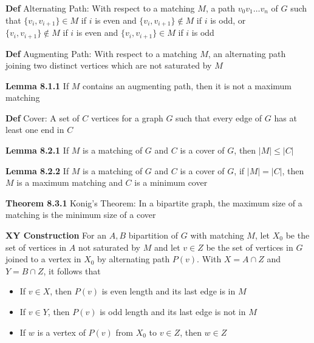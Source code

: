 \documentclass[11pt,notitlepage]{report}
\newcommand{\tbf}[1]{\textbf{#1}}
\begin{document}
\tbf{Def} Alternating Path: With respect to a matching $M$, a path $v_0v_1\dots v_n$ of $G$ such that $\{v_i,v_{i+1}\} \in M$ if $i$ is even and $\{v_i, v_{i+1}\} \not \in M$ if $i$ is odd, or\\
$\{v_i,v_{i+1}\} \not \in M$ if $i$ is even and $\{v_i, v_{i+1}\} \in M$ if $i$ is odd

\tbf{Def} Augmenting Path: With respect to a matching $M$, an alternating path joining two distinct vertices which are not saturated by $M$

\tbf{Lemma 8.1.1} If $M$ contains an augmenting path, then it is not a maximum matching

\tbf{Def} Cover: A set of $C$ vertices for a graph $G$ such that every edge of $G$ has at least one end in $C$

\tbf{Lemma 8.2.1} If $M$ is a matching of $G$ and $C$ is a cover of $G$, then $|M| \leq |C|$

\tbf{Lemma 8.2.2} If $M$ is a matching of $G$ and $C$ is a cover of $G$, if $|M| = |C|$, then $M$ is a maximum matching and $C$ is a minimum cover

\tbf{Theorem 8.3.1} Konig's Theorem: In a bipartite graph, the maximum size of a matching is the minimum size of a cover

\tbf{XY Construction} For an $A, B$ bipartition of $G$ with matching $M$, let $X_0$ be the set of vertices in $A$ not saturated by $M$ and let $v \in Z$ be the set of vertices in $G$ joined to a vertex in $X_0$ by alternating path $P(v)$. With $X =  A \cap Z$ and $Y = B \cap Z$, it follows that
\vspace{-4mm}
\begin{itemize}
    \item If $v \in X$, then $P(v)$ is even length and its last edge is in $M$
    \vspace{-2mm}
    \item If $v \in Y$, then $P(v)$ is odd length and its last edge is not in $M$
    \vspace{-2mm}
    \item If $w$ is a vertex of $P(v)$ from $X_0$ to $v \in Z$, then $w \in Z$
\end{itemize}
\vspace{-3mm}
\end{document}

